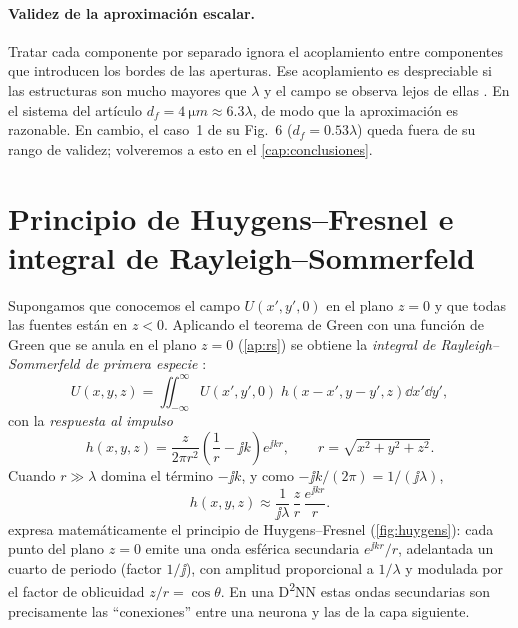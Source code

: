 \paragraph{Validez de la aproximación escalar.} Tratar cada componente por separado ignora
el acoplamiento entre componentes que introducen los bordes de las aperturas. Ese
acoplamiento es despreciable si las estructuras son mucho mayores que $\lambda$ y el campo se
observa lejos de ellas \parencite[sec.~3.2]{goodman2005}. En el sistema del artículo
$d_f=\SI{4}{\micro m}\approx6.3\lambda$, de modo que la aproximación es razonable. En cambio, el
caso~1 de su Fig.~6 ($d_f=0.53\lambda$) queda fuera de su rango de validez; volveremos a
esto en el \cref{cap:conclusiones}.

\section{Principio de Huygens--Fresnel e integral de Rayleigh--Sommerfeld}\label{sec:rs}

Supongamos que conocemos el campo $U(x',y',0)$ en el plano $z=0$ y que todas las fuentes
están en $z<0$. Aplicando el teorema de Green con una función de Green que se anula en el
plano $z=0$ (\cref{ap:rs}) se obtiene la \emph{integral de Rayleigh--Sommerfeld de primera
especie} \parencite[sec.~3.5]{goodman2005}:
\begin{equation}
  U(x,y,z)=\iint_{-\infty}^{\infty} U(x',y',0)\;h(x-x',y-y',z)\dd x'\dd y',
  \label{eq:rs}
\end{equation}
con la \emph{respuesta al impulso}
\begin{equation}
  h(x,y,z)=\frac{z}{2\pi r^2}\left(\frac{1}{r}-\jj k\right)e^{\jj kr},
  \qquad r=\sqrt{x^2+y^2+z^2}.
  \label{eq:h-rs}
\end{equation}
Cuando $r\gg\lambda$ domina el término $-\jj k$, y como $-\jj k/(2\pi)=1/(\jj\lambda)$,
\begin{equation}
  h(x,y,z)\approx\frac{1}{\jj\lambda}\,\frac{z}{r}\,\frac{e^{\jj kr}}{r}.
  \label{eq:huygens}
\end{equation}
 expresa matemáticamente el principio de Huygens--Fresnel
(\cref{fig:huygens}): cada punto del plano $z=0$ emite una onda esférica secundaria
$e^{\jj kr}/r$, adelantada un cuarto de periodo (factor $1/\jj$), con amplitud proporcional a
$1/\lambda$ y modulada por el factor de oblicuidad $z/r=\cos\theta$. En una D\textsuperscript{2}NN
estas ondas secundarias son precisamente las ``conexiones'' entre una neurona y las de la
capa siguiente.

